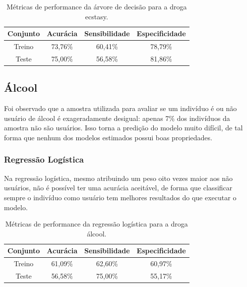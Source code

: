 \documentclass[
	article,			%
	11pt,				%
	oneside,			%
	a4paper,			%
	english,			%
	brazil,				%
	sumario=tradicional
	]{abntex2}
\begin{document}
\begin{table}[H]
\centering
\begin{tabular}{||c|c|c|c||}
\hline
Conjunto & Acurácia & Sensibilidade & Especificidade \\ \hline
Treino & 73,76\% & 60,41\% & 78,79\% \\ \hline
Teste & 75,00\% & 56,58\% & 81,86\% \\ \hline
\end{tabular}
\caption{Métricas de performance da árvore de decisão para a droga ecstasy.}
\label{resultados_ecstasy_podada}
\end{table}


\subsection{Álcool}

Foi observado que a amostra utilizada para avaliar se um indivíduo é ou não usuário de álcool é exageradamente desigual: apenas 7\% dos indivíduos da amostra não são usuários. Isso torna a predição do modelo muito difícil, de tal forma que nenhum dos modelos estimados possui boas propriedades. 

\subsubsection{Regressão Logística}

Na regressão logística, mesmo atribuindo um peso oito vezes maior aos não usuários, não é possível ter uma acurácia aceitável, de forma que classificar sempre o indivíduo como usuário tem melhores resultados do que executar o modelo.

\begin{table}[H]
\centering
\begin{tabular}{||c|c|c|c||}
\hline
Conjunto & Acurácia & Sensibilidade & Especificidade \\ \hline
Treino & 61,09\% & 62,60\% & 60,97\% \\ \hline
Teste & 56,58\% & 75,00\% & 55,17\% \\ \hline
\end{tabular}
\caption{Métricas de performance da regressão logística para a droga álcool.}
\label{resultados_reglogalcool}
\end{table}
\end{document}
